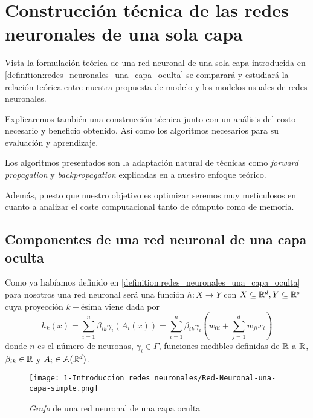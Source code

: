 %

\chapter{Construcción técnica de las redes neuronales de una sola capa}  
\label{chapter:construir-redes-neuronales}
Vista la formulación teórica de una red neuronal de una sola capa 
introducida en \ref{definition:redes_neuronales_una_capa_oculta} 
se comparará y estudiará la relación teórica 
entre nuestra propuesta de modelo y los modelos usuales de redes neuronales. 

Explicaremos también una construcción técnica junto con un
análisis del costo necesario y beneficio obtenido.
Así como los algoritmos necesarios para su evaluación y aprendizaje. 

 Los algoritmos presentados son 
 la adaptación natural de técnicas como 
\textit{forward propagation} y \textit{backpropagation } explicadas en \cite{BishopPaterRecognition} a nuestro enfoque teórico. 

Además, puesto que nuestro objetivo es optimizar seremos muy meticulosos en cuanto a analizar el 
coste computacional tanto de cómputo como de 
memoria.



\section{Componentes de una red neuronal de una capa oculta} 

Como ya habíamos definido en \ref{definition:redes_neuronales_una_capa_oculta}  
para nosotros una red neuronal será  una función $h : X \longrightarrow Y$ con $X \subseteq \mathbb{R}^d, Y \subseteq \mathbb{R}^s$ 
cuya proyección $k-$ésima viene dada por
\begin{equation}
    h_k(x) =  \sum_{i=1}^{n} \beta_{i k} \gamma_{i}( A_{i}(x))
    = 
    \sum_{i=1}^{n} \beta_{i k} \gamma_{i}
    \left(
        w_{0 i} + \sum_{j=1}^d w_{j i } x_i
    \right) 
\end{equation}
donde $n$ es el número de neuronas,   $\gamma_{i} \in \Gamma$, funciones medibles definidas de $\mathbb{R}$ a $\mathbb{R}$,
$\beta_{i k} \in \mathbb{R}$ y $A_i \in \mathcal{A}(\mathbb{R}^d)$.

\begin{figure}[h!]
    \centering
    \texttt{[image: 1-Introduccion\_redes\_neuronales/Red-Neuronal-una-capa-simple.png]}
    \caption{\textit{Grafo} de una red neuronal de una capa oculta}
    \label{img:grafo-red-neuronal-una-capa-oculta_repeticion}
\end{figure}

